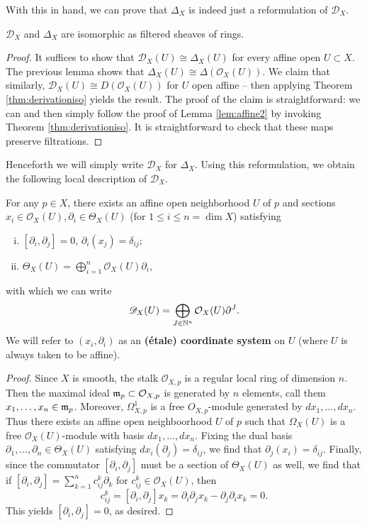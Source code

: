 With this in hand, we can prove that $\Delta_X$ is indeed just a reformulation of
$\mathscr{D}_X$. 

\begin{theorem}
    $\mathscr{D}_X$ and $\Delta_X$ are isomorphic as filtered sheaves of rings.
    \label{thm:Dequiv}
\end{theorem}
\begin{proof}
    It suffices to show that $\mathscr{D}_X(U)\cong\Delta_X(U)$ for every affine open $U\subset X$.
    The previous lemma shows that $\Delta_X(U)\cong\Delta(\mathcal{O}_X(U))$. We claim that similarly,
    $\mathscr{D}_X(U)\cong D(\mathcal{O}_X(U))$ for $U$ open affine -- then applying Theorem \ref{thm:derivationiso} yields
    the result. 
    The proof of the claim is straightforward: we can and then simply follow the proof of Lemma
    \ref{lem:affine2} by invoking Theorem \ref{thm:derivationiso}.
    It is straightforward to check that these maps preserve filtrations.
\end{proof}

Henceforth we will simply write $\mathscr{D}_X$ for $\Delta_X$. Using this reformulation,
we obtain the following local description of $\mathscr{D}_X$.

\begin{lemma}
    For any $p\in X$, there exists an affine open neighborhood $U$ of $p$ and sections
    $x_i\in\mathcal{O}_X(U),\partial_i\in\Theta_X(U)$ (for $1\leqslant i\leqslant n=\dim X$) satisfying
    \begin{enumerate}[(i)]
        \item $[\partial_i,\partial_j]=0$, $\partial_i(x_j)=\delta_{ij}$;
        \item $\Theta_X(U)=\bigoplus_{i=1}^n\mathcal{O}_X(U)\partial_i$,
    \end{enumerate}
    with which we can write
    \[\mathscr{D}_X(U)=\bigoplus_{J\in\mathbb{N}^n}\mathcal{O}_X(U)\partial^J.\]
    We will refer to $(x_i,\partial_i)$ as an \textbf{(\'etale) coordinate system} on $U$
    (where $U$ is always taken to be affine).
\end{lemma}
\begin{proof}
    Since $X$ is smooth, the stalk $\mathcal{O}_{X,p}$ is a regular local ring of dimension $n$.
    Then the maximal ideal $\mathfrak m_p\subset \mathcal{O}_{X,p}$ is generated by $n$ elements, call them
    $x_1,\ldots,x_n\in\mathfrak m_p$. Moreover, $\Omega^1_{X,p}$ is a free $O_{X,p}$-module generated
    by $dx_1,\ldots, dx_n$. Thus there exists an affine open neighboorhood
    $U$ of $p$ such that $\Omega_X(U)$ is a free $\mathcal{O}_X(U)$-module with basis
    $dx_1,\ldots,dx_n$. Fixing the dual basis $\partial_1,\ldots,\partial_n\in\Theta_X(U)$
    satisfying $dx_i(\partial_j)=\delta_{ij}$, we find that $\partial_j(x_i)=\delta_{ij}$.
    Finally, since the commutator $[\partial_i,\partial_j]$ must be a section of $\Theta_X(U)$
    as well, we find that if $[\partial_i,\partial_j] = \sum_{k=1}^n c_{ij}^k\partial_k$
    for $c_{ij}^k\in\mathcal{O}_X(U)$, then
    \[c_{ij}^k=[\partial_i,\partial_j]x_k=\partial_i\partial_jx_k - \partial_j\partial_ix_k=0.\]
    This yields $[\partial_i,\partial_j]=0$, as desired.
\end{proof}

